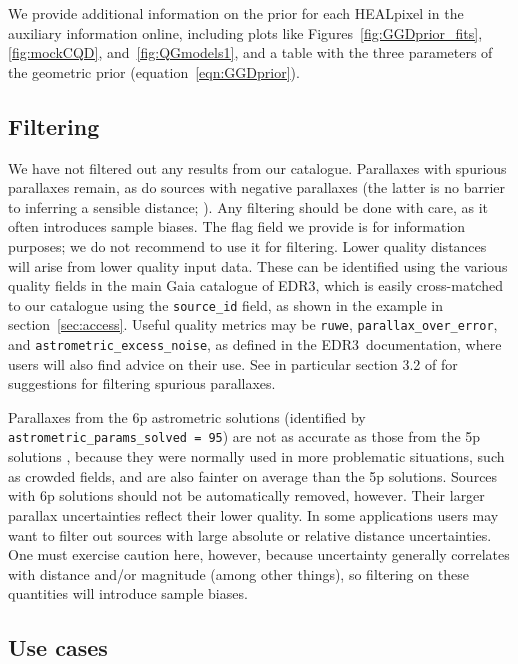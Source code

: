 \documentclass[twocolumn]{aastex62}
\providecommand{\release}{EDR3}
\begin{document}
We provide additional information on the prior for each HEALpixel in the auxiliary information online, including plots like Figures~\ref{fig:GGDprior_fits}, \ref{fig:mockCQD}, and~\ref{fig:QGmodels1}, and a table with the three parameters of the geometric prior (equation~\ref{eqn:GGDprior}).

\subsection{Filtering}

We have not filtered out any results from our catalogue. Parallaxes with spurious parallaxes remain, as do sources with negative parallaxes (the latter is no barrier to inferring a sensible distance; \citealt{2015PASP..127..994B}).
Any filtering should be done with care, as it often introduces sample biases.
The flag field we provide is for information purposes; we do not recommend to use it for filtering. Lower quality distances will arise from lower quality input data.
These can be identified using the various quality fields in the main Gaia catalogue of \release, which is easily cross-matched to our catalogue using the {\tt source\_id} field, as shown in the example in section~\ref{sec:access}. Useful quality metrics may be {\tt ruwe}, {\tt parallax\_over\_error}, and {\tt astrometric\_excess\_noise}, as defined in the \release\ documentation, where users will also find advice on their use.
See in particular section 3.2 of
\cite{fabricius_etal_gedr3_validation} for suggestions for filtering spurious parallaxes.

Parallaxes from the 6p astrometric solutions (identified by {\tt astrometric\_params\_solved = 95}) are not as accurate as those from the 5p solutions \citep{lindegren_etal_gedr3_astrometry}, because they were normally used in more problematic situations, such as crowded fields, and are also fainter on average than the 5p solutions. Sources with 6p solutions should not be automatically removed, however. Their larger parallax uncertainties reflect their lower quality.
In some applications users may want to filter out sources with large absolute or relative distance uncertainties.  One must exercise caution here, however, because uncertainty generally correlates with distance and/or magnitude (among other things), so filtering on these quantities will introduce sample biases. 

\subsection{Use cases}
\end{document}
